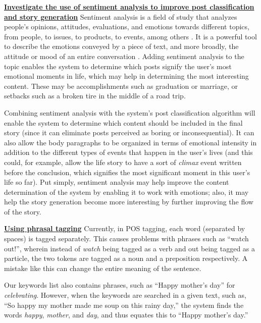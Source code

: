 \underline{\textbf{Investigate the use of sentiment analysis to improve post classification}}
\underline{\textbf{ and story generation}} \newline
Sentiment analysis is a field of study that analyzes people's opinions, attitudes, evaluations, and emotions towards different topics, from people, to issues, to products, to events, among others \cite{Liu12sentimentanalysi}. It is a powerful tool to describe the emotions conveyed by a piece of text, and more broadly, the attitude or mood of an entire conversation \cite{DBLP:journals/corr/VarolFDMF17}. Adding sentiment analysis to the topic enables the system to determine which posts signify the user's most emotional moments in life, which may help in determining the most interesting content. These may be accomplishments such as graduation or marriage, or setbacks such as a broken tire in the middle of a road trip. 

Combining sentiment analysis with the system's post classification algorithm will enable the system to determine which content should be included in the final story (since it can eliminate posts perceived as boring or inconsequential). It can also allow the body paragraphs to be organized in terms of emotional intensity in addition to the different types of events that happen in the user's lives (and this could, for example, allow the life story to have a sort of \textit{climax} event written before the conclusion, which signifies the most significant moment in this user's life so far). Put simply, sentiment analysis may help improve the content determination of the system by enabling it to work with emotions; also, it may help the story generation become more interesting by further improving the flow of the story.

\underline{\textbf{Using phrasal tagging}} \newline
Currently, in POS tagging, each word (separated by spaces) is tagged separately. This causes problems with phrases such as ``watch out!'', wherein instead of \textit{watch} being tagged as a verb and out being tagged as a particle, the two tokens are tagged as a noun and a preposition respectively. A mistake like this can change the entire meaning of the sentence.

Our keywords list also contains phrases, such as ``Happy mother's day'' for \textit{celebrating}. However, when the keywords are searched in a given text, such as, ``So happy my mother made me soup on this rainy day,'' the system finds the words \textit{happy}, \textit{mother}, and \textit{day}, and thus equates this to ``Happy mother's day.''

